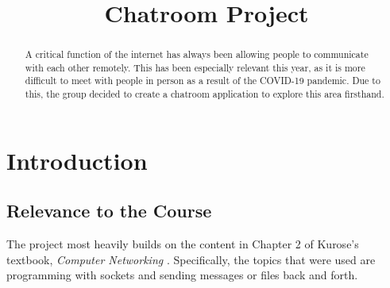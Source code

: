 \documentclass{article}
\begin{document}
\sloppy



\title{Chatroom Project}
%
\address{}


\maketitle


%
\begin{abstract}

A critical function of the internet has always been allowing people to communicate with each other remotely. This has been especially relevant this year, as it is more difficult to meet with people in person as a result of the COVID-19 pandemic. Due to this, the group decided to create a chatroom application to explore this area firsthand. 

\end{abstract}
%
%
\section{Introduction}
\label{sec:intro}


\subsection{Relevance to the Course}

The project most heavily builds on the content in Chapter 2 of Kurose's textbook, \emph{Computer Networking} \cite{kurose}. Specifically, the topics that were used are programming with sockets and sending messages or files back and forth. 
\end{document}
